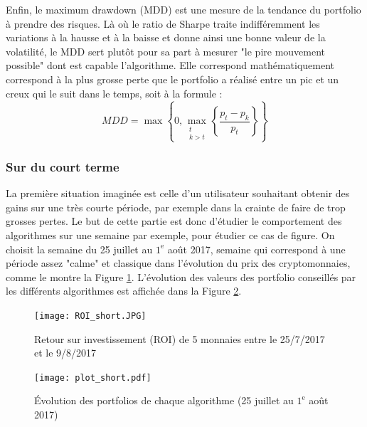 \documentclass[a4paper, 10pt]{article}
\begin{document}
Enfin, le maximum drawdown (MDD) \cite{Magdon2004} est une mesure de la tendance du portfolio à prendre des risques. Là où le ratio de Sharpe traite indifféremment les variations à la hausse et à la baisse et donne ainsi une bonne valeur de la volatilité, le MDD sert plutôt pour sa part à mesurer "le pire mouvement possible" dont est capable l'algorithme. Elle correspond mathématiquement correspond à la plus grosse perte que le portfolio a réalisé entre un pic et un creux qui le suit dans le temps, soit à la formule : 
\begin{equation}
    MDD = \max \left \{ 0, \max\limits_{\substack{t \\ k > t}} \left \{ \frac{p_t - p_k}{p_t} \right \} \right \}
\end{equation}

\subsubsection{Sur du court terme}

La première situation imaginée est celle d'un utilisateur souhaitant obtenir des gains sur une très courte période, par exemple dans la crainte de faire de trop grosses pertes. Le but de cette partie est donc d'étudier le comportement des algorithmes sur une semaine par exemple, pour étudier ce cas de figure. On choisit la semaine du 25 juillet au $1^{\text{e}}$ août 2017, semaine qui correspond à une période assez "calme" et classique dans l'évolution du prix des cryptomonnaies, comme le montre la Figure \ref{fig:roi_short}. L'évolution des valeurs des portfolio conseillés par les différents algorithmes est affichée dans la Figure \ref{fig:plot_short}.

\begin{figure}[ht!]
\begin{center}
\texttt{[image: ROI\_short.JPG]}
\caption{Retour sur investissement (ROI) de 5 monnaies entre le 25/7/2017 et le 9/8/2017}
\label{fig:roi_short}
\end{center}
\end{figure}

\begin{figure}[ht!]
\begin{center}
\texttt{[image: plot\_short.pdf]}
\caption{Évolution des portfolios de chaque algorithme (25 juillet au $1^{\text{e}}$ août 2017)}
\label{fig:plot_short}
\end{center}
\end{figure}
\end{document}

